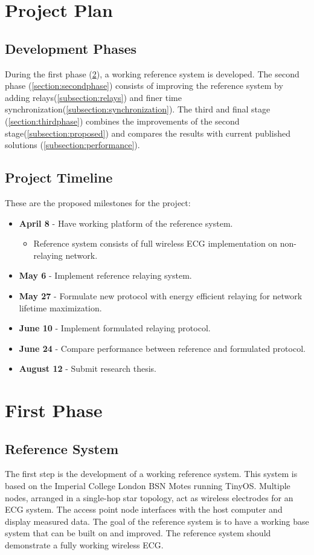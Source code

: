\documentclass{article}
\begin{document}
\section{Project Plan}\label{section:plan}
\subsection{Development Phases}
During the first phase (\ref{section:firstphase}), a working reference system is developed. The second phase (\ref{section:secondphase}) consists of improving the reference system by adding relays(\ref{subsection:relays}) and finer time synchronization(\ref{subsection:synchronization}). The third and final stage (\ref{section:thirdphase}) combines the improvements of the second stage(\ref{subsection:proposed}) and compares the results with current published solutions (\ref{subsection:performance}).

\subsection{Project Timeline}
These are the proposed milestones for the project:

\begin{itemize}
	\item \textbf{April 8} - Have working platform of the reference system.
	\begin{itemize}
		\item Reference system consists of full wireless ECG implementation on non-relaying network.
	\end{itemize}
	\item \textbf{May 6} - Implement reference relaying system.
	\item \textbf{May 27} - Formulate new protocol with energy efficient relaying for network lifetime maximization.
	\item \textbf{June 10} - Implement formulated relaying protocol.
	\item \textbf{June 24} - Compare performance between reference and formulated protocol.
	\item \textbf{August 12} - Submit research thesis.
\end{itemize}

\section{First Phase}\label{section:firstphase}

\subsection{Reference System}
The first step is the development of a working reference system. This system is based on the Imperial College London BSN Motes running TinyOS. Multiple nodes, arranged in a single-hop star topology, act as wireless electrodes for an ECG system. The access point node interfaces with the host computer and display measured data. The goal of the reference system is to have a working base system that can be built on and improved. The reference system should demonstrate a fully working wireless ECG.
\end{document}
